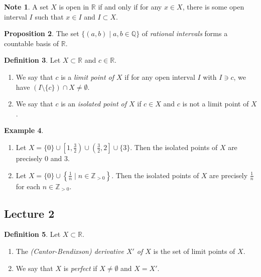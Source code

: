 \documentclass[10pt,letterpaper,cm]{nupset}
\theoremstyle{definition}
\newtheorem{definition}{Definition}[subsection]
\newtheorem{exmp}[definition]{Example}
\newtheorem{note}[definition]{Note}
\theoremstyle{theorem}
\newtheorem{prop}[definition]{Proposition}
\theoremstyle{remark}
\newcommand{\Q}{\mathbb Q}
\newcommand{\R}{\mathbb R}
\newcommand{\Z}{\mathbb Z}
\newcommand{\1}{\mathbf{1}}
\newcommand{\0}{\vec 0}
\begin{document}
\begin{note}
A set $X$ is open in $\R$ if and only if for any $x\in X$, there is some open interval $I$ such that  $x\in I$ and $I \subset X$.  
\end{note}

\begin{prop}
The set $\{(a,b) \mid a, b\in \Q \}$ of \textit{rational intervals} forms a countable basis of $\R$.
\end{prop}

\begin{definition} Let $X\subset \R$ and $c\in \R$.
\begin{enumerate}
\item We say that $c$ is a \textit{limit point of $X$} if for any open interval $I$ with $I\ni c$, we have $(I\setminus \{c\}) \cap X \ne \emptyset$.
\item We say that $c$ is an \textit{isolated point of $X$} if $c\in X$ and $c$ is not a limit point of $X$.
\end{enumerate}
\end{definition}

\begin{exmp} $ $
\begin{enumerate}
\item Let $X = \{0\} \cup \left[1, \frac{3}{2}\right) \cup \left(\frac{3}{2}, 2\right] \cup \{3\}$. Then the isolated points of $X$ are precisely $0$ and $3$. 
\item Let $X = \{0\} \cup \left\{\frac{1}{n} \mid n \in \Z_{>0}\right\}$. Then the isolated points of $X$ are precisely $\frac{1}{n}$ for each $n\in \Z_{>0}$.
\end{enumerate}
\end{exmp}

\subsection{Lecture 2}

\begin{definition} Let $X\subset \R$. 
\begin{enumerate} 
\item The \textit{(Cantor-Bendixson) derivative $X'$ of $X$} is the set of limit points of $X$. 
\item We say that $X$ is \textit{perfect} if $X \ne \emptyset$ and $X = X'$.
\end{enumerate}
\end{definition}
\end{document}

